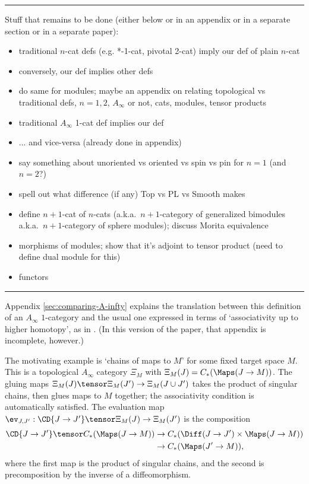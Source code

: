 
\medskip
\hrule
\medskip

\medskip


Stuff that remains to be done (either below or in an appendix or in a separate section or in
a separate paper):
\begin{itemize}
\item traditional $n$-cat defs (e.g. *-1-cat, pivotal 2-cat) imply our def of plain $n$-cat
\item conversely, our def implies other defs
\item do same for modules; maybe an appendix on relating topological
vs traditional defs, $n = 1,2$, $A_\infty$ or not, cats, modules, tensor products
\item traditional $A_\infty$ 1-cat def implies our def
\item ... and vice-versa (already done in appendix)
\item say something about unoriented vs oriented vs spin vs pin for $n=1$ (and $n=2$?)
\item spell out what difference (if any) Top vs PL vs Smooth makes
\item define $n{+}1$-cat of $n$-cats (a.k.a.\ $n{+}1$-category of generalized bimodules
a.k.a.\ $n{+}1$-category of sphere modules); discuss Morita equivalence
\item morphisms of modules; show that it's adjoint to tensor product
(need to define dual module for this)
\item functors
\end{itemize}

\hrule

Appendix \ref{sec:comparing-A-infty} explains the translation between this definition of an $A_\infty$ $1$-category and the usual one expressed in terms of `associativity up to higher homotopy', as in \cite{MR1854636}. (In this version of the paper, that appendix is incomplete, however.)

The motivating example is `chains of maps to $M$' for some fixed target space $M$. This is a topological $A_\infty$ category $\Xi_M$ with $\Xi_M(J) = C_*(\Maps(J \to M))$. The gluing maps $\Xi_M(J) \tensor \Xi_M(J') \to \Xi_M(J \cup J')$  takes the product of singular chains, then glues maps to $M$ together; the associativity condition is automatically satisfied. The evaluation map $\ev_{J,J'} : \CD{J \to J'} \tensor \Xi_M(J) \to \Xi_M(J')$ is the composition
\begin{align*}
\CD{J \to J'} \tensor C_*(\Maps(J \to M)) & \to C_*(\Diff(J \to J') \times \Maps(J \to M)) \\ & \to C_*(\Maps(J' \to M)),
\end{align*}
where the first map is the product of singular chains, and the second is precomposition by the inverse of a diffeomorphism.


